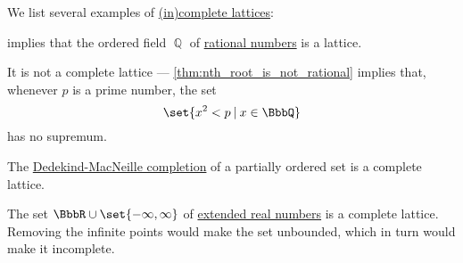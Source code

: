 \begin{proposition}\label{ex:def:complete_lattice}
  We list several examples of \hyperref[def:complete_lattice]{(in)complete lattices}:
  \begin{thmenum}
      implies that the ordered field \( \BbbQ \) of \hyperref[def:rational_numbers]{rational numbers} is a lattice.

    It is not a complete lattice --- \cref{thm:nth_root_is_not_rational} implies that, whenever \( p \) is a prime number, the set
    \begin{equation*}
      \set{ x^2 < p \given x \in \BbbQ }
    \end{equation*}
    has no supremum.

     The \hyperref[def:dedekind_macnielle_completion]{Dedekind-MacNeille completion} of a partially ordered set is a complete lattice.

     The set \( \BbbR \cup \set{ -\infty, \infty } \) of \hyperref[def:extended_real_numbers]{extended real numbers} is a complete lattice. Removing the infinite points would make the set unbounded, which in turn would make it incomplete.
  \end{thmenum}
\end{proposition}

